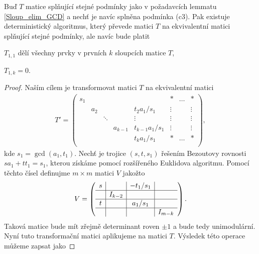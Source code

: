 \begin{lem} \label{Sloup_elim_SNF}
Buď $ T $ matice splňující stejné podmínky jako v požadavcích lemmatu \ref{Sloup_elim_GCD}
a nechť je navíc splněna podmínka (c3). Pak existuje deterministický
algoritmus, který převede matici $ T $ na ekvivalentní matici splňující stejné
podmínky, ale navíc bude platit
\begin{Cond}[resume=Sloup_elim_CONDS]
    \item $ T_{1,1} $ dělí všechny prvky v prvních $ k $ sloupcích matice $ T $,
    \item $ T_{1,k} = 0 $.
\end{Cond}
\end{lem}
\begin{proof}
Naším cílem je transformovat matici $ T $ na ekvivalentní matici
\begin{align*}
T' =
    \left(
    \begin{array}{ccccc|ccc}
        s_1 &     &        &         &                 & \ast   & \hdots & \ast   \\
            & a_2 &        &         & t_2 a_1/s_1     & \vdots &        & \vdots \\
            &     & \ddots &         & \vdots          & \vdots &        & \vdots \\
            &     &        & a_{k-1} & t_{k-1} a_1/s_1 & \vdots &        & \vdots \\
            &     &        &         & t_k a_1/s_1     & \ast   & \hdots & \ast \\
    \end{array}
    \right),
\end{align*}
kde $ s_1 = \gcd(a_1, t_1) $. Nechť je trojice $ (s, t, s_1) $ řešením Bezoutovy
rovnosti $ s a_1 + t t_1 = s_1 $, kterou získáme pomocí rozšířeného Euklidova algoritmu.
Pomocí těchto čísel definujme $ m \times m $ matici $ V $ jakožto
\begin{align*}
V =
    \left(
    \begin{array}{c|c|c|c}
      s      &         & - t_1 / s_1 &         \\ \hline
             & I_{k-2} &             &         \\ \hline
      t      &         & a_1 / s_1   &         \\ \hline
             &         &             & I_{m-k} \\
    \end{array}
    \right)
.
\end{align*}
Taková matice bude mít zřejmě determinant roven $ \pm 1 $ a bude tedy
unimodulární. Nyní tuto transformační matici aplikujeme na matici $ T $.
Výsledek této operace můžeme zapsat jako


\end{proof}
